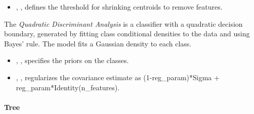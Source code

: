 \begin{itemize}
  \item {}, , defines
  the threshold for shrinking centroids to remove features.
\end{itemize}


The \textit{Quadratic Discriminant Analysis} is a classifier with a quadratic
decision boundary, generated by fitting class conditional densities to the data
and using Bayes' rule.
%
The model fits a Gaussian density to each class.

\begin{itemize}
  \item {}, ,
  specifies the priors on the classes.
  \item {}, , regularizes the
  covariance estimate as (1-reg\_param)*Sigma +
  reg\_param*Identity(n\_features).
\end{itemize}
\paragraph{Tree}
\label{tree}

